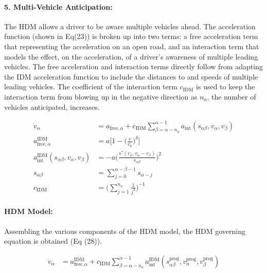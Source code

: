 \documentclass[12pt]{article}
\begin{document}
\paragraph{5. Multi-Vehicle Anticipation:}
The HDM allows a driver to be aware multiple vehicles ahead.  The acceleration function (shown in Eq(23)) is broken up into two terms: a free acceleration term that representing the acceleration on an open road, and an interaction term that models the effect, on the acceleration, of a driver's awareness of multiple leading vehicles.  The free acceleration and interaction terms directly follow from adapting the IDM acceleration function to include the distances to and speeds of multiple leading vehicles.  The coefficient of the interaction term $c_{\text{IDM}}$ is used to keep the interaction term from blowing up in the negative direction as $n_a$, the number of vehicles anticipated, increases.
\begin{mymathbox}[ams gather, title=Multi-Vehicle Anticipation Equations,colframe=blue!30!black]
  \begin{align}
  \dot v_\alpha &= a_{\text{free},\alpha}+c_{\text{IDM}}\sum_{\beta=\alpha-n_a}^{\alpha-1}a_{\text{int}}(s_{\alpha\beta},v_\alpha,v_\beta)\\
  a^{\text{IDM}}_{\text{free},\alpha}&=a\Bigg[1-\bigg(\frac{v}{v_0}\bigg)^\delta\Bigg]\\
  a^{\text{IDM}}_{\text{int}}(s_{\alpha\beta},v_\alpha,v_\beta)&=-a\Bigg(\frac{s^*(v_\alpha,v_\alpha-v_\beta)}{s_{\alpha\beta}}\Bigg)^2\\
  s_{\alpha\beta}&=\sum_{j=0}^{\alpha-\beta-1}s_{\alpha-j}\\
  c_{\text{IDM}}&=\Bigg(\sum_{j=1}^{n_a}\frac{1}{j^2}\Bigg)^{-1}
  \end{align}
\end{mymathbox}
\paragraph{HDM Model:}
Assembling the various components of the HDM model, the HDM governing equation is obtained (Eq (28)).
\begin{mymathbox}[ams gather, title=HDM Governing Equation,colframe=blue!30!black]
  \begin{align}
\dot v_\alpha &= a_{\text{free},\alpha}^{\text{IDM}}+c_{\text{IDM}}\sum_{\beta=\alpha-n_a}^{\alpha-1}a_{\text{int}}^{\text{IDM}}(s^{\text{prog}}_{\alpha\beta},v^{\text{prog}}_\alpha,v^{\text{prog}}_\beta)
  \end{align}
\end{mymathbox}
\end{document}
